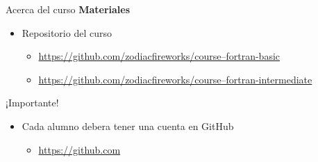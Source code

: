 \begin{frame}[fragile]{Acerca del curso}
  \textbf{Materiales}
  \begin{itemize}[<+(1)->]
    \item[] Repositorio del curso
    \begin{itemize}
      \item[\faGithub] \href{https://github.com/zodiacfireworks/course--fortran-basic}{https://github.com/zodiacfireworks/course--fortran-basic}
      \item[\faGithub] \href{https://github.com/zodiacfireworks/course--fortran-intermediate}{https://github.com/zodiacfireworks/course--fortran-intermediate}
    \end{itemize}
  \end{itemize}

  \begin{alertblock}{¡Importante!}
    \begin{itemize}[<+(2)->]
      \item[] Cada alumno debera tener una cuenta en GitHub
      \begin{itemize}
        \item[\color{black}\faGithub] \href{https://github.com}{https://github.com}
      \end{itemize}
    \end{itemize}
  \end{alertblock}
\end{frame}


